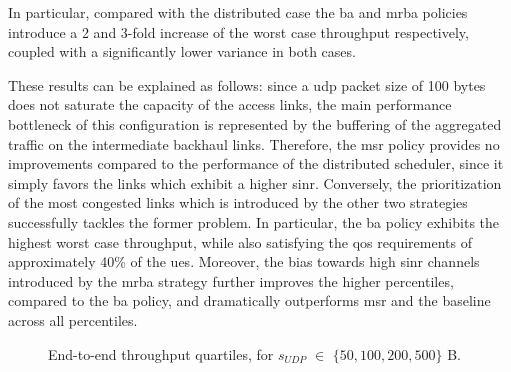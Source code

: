 In particular, compared with the distributed case the \gls{ba} and \gls{mrba} policies introduce a 2 and 3-fold increase of the worst case throughput respectively, coupled with a significantly lower variance in both cases. 

These results can be explained as follows: since a \gls{udp} packet size of 100 bytes does not saturate the capacity of the access links, the main performance bottleneck of this configuration is represented by the buffering of the aggregated traffic on the intermediate backhaul links. Therefore, the \gls{msr} policy provides no improvements compared to the performance of the distributed scheduler, since it simply favors the links which exhibit a higher \gls{sinr}. Conversely, the prioritization of the most congested links which is introduced by the other two strategies successfully tackles the former problem. 
In particular, the \gls{ba} policy exhibits the highest worst case throughput, while also satisfying the \gls{qos} requirements of approximately 40\% of the \glspl{ue}. Moreover, the bias towards high \gls{sinr} channels introduced by the \gls{mrba} strategy further improves the higher percentiles, compared to the \gls{ba} policy, and dramatically outperforms \gls{msr} and the baseline across all percentiles. 
\begin{figure}[t!]
  \centering
  \hfill
{}
   \caption{End-to-end throughput quartiles, for $s_{UDP}$ $\in$ $\{50, 100, 200, 500 \}$ B.}
  \label{Fig:Throughput_quartiles}
  \vspace{-0.1cm} 
\end{figure}

